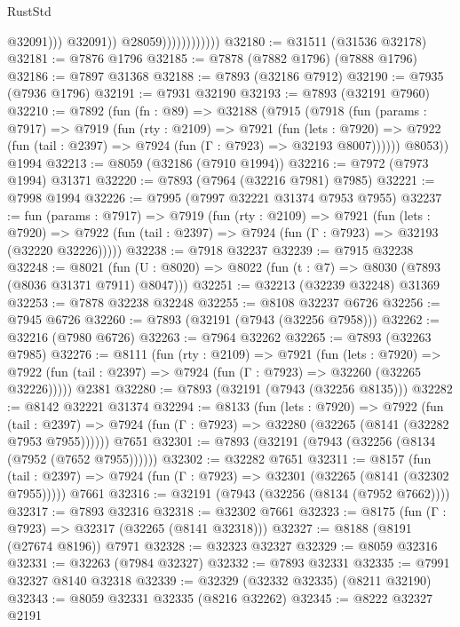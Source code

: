 \begin{lexlean}{RustStd}
\begin{coremodule}
                                      @32091)))
                                @32091))
                            @28059))))))))))))
@32180 := @31511 (@31536 @32178)
@32181 := @7876 @1796
@32185 := @7878 (@7882 @1796) (@7888 @1796)
@32186 := @7897 @31368
@32188 := @7893 (@32186 @7912)
@32190 := @7935 (@7936 @1796)
@32191 := @7931 @32190
@32193 := @7893 (@32191 @7960)
@32210 := @7892
    (fun (fn : @89) =>
    @32188
      (@7915
        (@7918
          (fun (params : @7917) =>
          @7919
            (fun (rty : @2109) =>
            @7921
              (fun (lets : @7920) =>
              @7922 (fun (tail : @2397) => @7924 (fun (Γ : @7923) => @32193 @8007))))))
        @8053))
    @1994
@32213 := @8059 (@32186 (@7910 @1994))
@32216 := @7972 (@7973 @1994) @31371
@32220 := @7893 (@7964 (@32216 @7981) @7985)
@32221 := @7998 @1994
@32226 := @7995 (@7997 @32221 @31374 @7953 @7955)
@32237 := fun (params : @7917) =>
  @7919
    (fun (rty : @2109) =>
    @7921
      (fun (lets : @7920) =>
      @7922 (fun (tail : @2397) => @7924 (fun (Γ : @7923) => @32193 (@32220 @32226)))))
@32238 := @7918 @32237
@32239 := @7915 @32238
@32248 := @8021
    (fun (U : @8020) => @8022 (fun (t : @7) => @8030 (@7893 (@8036 @31371 @7911) @8047)))
@32251 := @32213 (@32239 @32248) @31369
@32253 := @7878 @32238 @32248
@32255 := @8108 @32237 @6726
@32256 := @7945 @6726
@32260 := @7893 (@32191 (@7943 (@32256 @7958)))
@32262 := @32216 (@7980 @6726)
@32263 := @7964 @32262
@32265 := @7893 (@32263 @7985)
@32276 := @8111
    (fun (rty : @2109) =>
    @7921
      (fun (lets : @7920) =>
      @7922 (fun (tail : @2397) => @7924 (fun (Γ : @7923) => @32260 (@32265 @32226)))))
    @2381
@32280 := @7893 (@32191 (@7943 (@32256 @8135)))
@32282 := @8142 @32221 @31374
@32294 := @8133
    (fun (lets : @7920) =>
    @7922
      (fun (tail : @2397) =>
      @7924 (fun (Γ : @7923) => @32280 (@32265 (@8141 (@32282 @7953 @7955))))))
    @7651
@32301 := @7893 (@32191 (@7943 (@32256 (@8134 (@7952 (@7652 @7955))))))
@32302 := @32282 @7651
@32311 := @8157
    (fun (tail : @2397) => @7924 (fun (Γ : @7923) => @32301 (@32265 (@8141 (@32302 @7955)))))
    @7661
@32316 := @32191 (@7943 (@32256 (@8134 (@7952 @7662))))
@32317 := @7893 @32316
@32318 := @32302 @7661
@32323 := @8175 (fun (Γ : @7923) => @32317 (@32265 (@8141 @32318)))
@32327 := @8188 (@8191 (@27674 @8196)) @7971
@32328 := @32323 @32327
@32329 := @8059 @32316
@32331 := @32263 (@7984 @32327)
@32332 := @7893 @32331
@32335 := @7991 @32327 @8140 @32318
@32339 := @32329 (@32332 @32335) (@8211 @32190)
@32343 := @8059 @32331 @32335 (@8216 @32262)
@32345 := @8222 @32327 @2191

\end{coremodule}
\end{lexlean}
